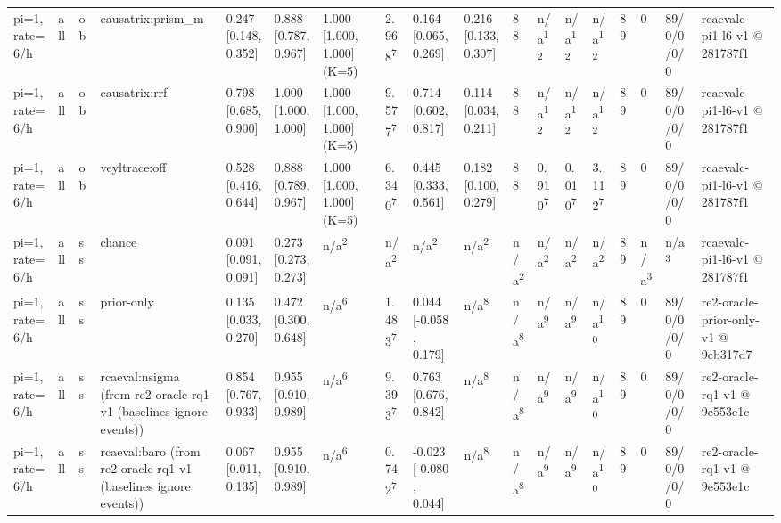 \begin{table}[t]
\begin{tabular}{llllllllllllllllll}
pi=1, rate=6/h & all & ob & causatrix:prism\_m & 0.247 [0.148, 0.352] & 0.888 [0.787, 0.967] & 1.000 [1.000, 1.000] (K=5) & 2.968\textsuperscript{7} & 0.164 [0.065, 0.269] & 0.216 [0.133, 0.307] & 88 & n/a\textsuperscript{12} & n/a\textsuperscript{12} & n/a\textsuperscript{12} & 89 & 0 & 89/0/0/0/0 & rcaevalc-pi1-l6-v1 @ 281787f1 \\
pi=1, rate=6/h & all & ob & causatrix:rrf & 0.798 [0.685, 0.900] & 1.000 [1.000, 1.000] & 1.000 [1.000, 1.000] (K=5) & 9.577\textsuperscript{7} & 0.714 [0.602, 0.817] & 0.114 [0.034, 0.211] & 88 & n/a\textsuperscript{12} & n/a\textsuperscript{12} & n/a\textsuperscript{12} & 89 & 0 & 89/0/0/0/0 & rcaevalc-pi1-l6-v1 @ 281787f1 \\
pi=1, rate=6/h & all & ob & veyltrace:off & 0.528 [0.416, 0.644] & 0.888 [0.789, 0.967] & 1.000 [1.000, 1.000] (K=5) & 6.340\textsuperscript{7} & 0.445 [0.333, 0.561] & 0.182 [0.100, 0.279] & 88 & 0.910\textsuperscript{7} & 0.010\textsuperscript{7} & 3.112\textsuperscript{7} & 89 & 0 & 89/0/0/0/0 & rcaevalc-pi1-l6-v1 @ 281787f1 \\
pi=1, rate=6/h & all & ss & chance & 0.091 [0.091, 0.091] & 0.273 [0.273, 0.273] & n/a\textsuperscript{2} & n/a\textsuperscript{2} & n/a\textsuperscript{2} & n/a\textsuperscript{2} & n/a\textsuperscript{2} & n/a\textsuperscript{2} & n/a\textsuperscript{2} & n/a\textsuperscript{2} & 89 & n/a\textsuperscript{3} & n/a\textsuperscript{3} & rcaevalc-pi1-l6-v1 @ 281787f1 \\
pi=1, rate=6/h & all & ss & prior-only & 0.135 [0.033, 0.270] & 0.472 [0.300, 0.648] & n/a\textsuperscript{6} & 1.483\textsuperscript{7} & 0.044 [-0.058, 0.179] & n/a\textsuperscript{8} & n/a\textsuperscript{8} & n/a\textsuperscript{9} & n/a\textsuperscript{9} & n/a\textsuperscript{10} & 89 & 0 & 89/0/0/0/0 & re2-oracle-prior-only-v1 @ 9cb317d7 \\
pi=1, rate=6/h & all & ss & rcaeval:nsigma (from re2-oracle-rq1-v1 (baselines ignore events)) & 0.854 [0.767, 0.933] & 0.955 [0.910, 0.989] & n/a\textsuperscript{6} & 9.393\textsuperscript{7} & 0.763 [0.676, 0.842] & n/a\textsuperscript{8} & n/a\textsuperscript{8} & n/a\textsuperscript{9} & n/a\textsuperscript{9} & n/a\textsuperscript{10} & 89 & 0 & 89/0/0/0/0 & re2-oracle-rq1-v1 @ 9e553e1c \\
pi=1, rate=6/h & all & ss & rcaeval:baro (from re2-oracle-rq1-v1 (baselines ignore events)) & 0.067 [0.011, 0.135] & 0.955 [0.910, 0.989] & n/a\textsuperscript{6} & 0.742\textsuperscript{7} & -0.023 [-0.080, 0.044] & n/a\textsuperscript{8} & n/a\textsuperscript{8} & n/a\textsuperscript{9} & n/a\textsuperscript{9} & n/a\textsuperscript{10} & 89 & 0 & 89/0/0/0/0 & re2-oracle-rq1-v1 @ 9e553e1c \\

\end{tabular}
\end{table}
